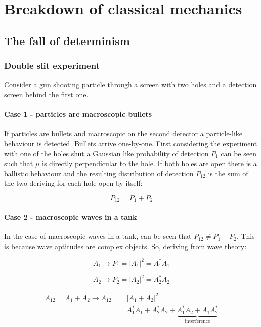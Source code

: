 \chapter{Breakdown of classical mechanics}

\section{The fall of determinism}

  \subsection{Double slit experiment}
  Consider a gun shooting particle through a screen with two holes and a detection screen behind the first one.

    \subsubsection{Case 1 - particles are macroscopic bullets}
    If particles are bullets and macroscopic on the second detector a particle-like behaviour is detected.
    Bullets arrive one-by-one.
    First considering the experiment with one of the holes shut a Gaussian like probability of detection $P_1$ can be seen such that $\mu$ is directly perpendicular to the hole.
    If both holes are open there is a ballistic behaviour and the resulting distribution of detection $P_{12}$ is the sum of the two deriving for each hole open by itself:

    $$P_{12} = P_1+P_2$$

    \subsubsection{Case 2 - macroscopic waves in a tank}
    In the case of macroscopic waves in a tank, can be seen that $P_{12} \neq P_1+P_2$.
    This is because wave aptitudes are complex objects.
    So, deriving from wave theory:

    $$A_1\rightarrow P_1 = |A_1|^2 = A_1^*A_1$$
      
    $$A_2\rightarrow P_2 = |A_2|^2 = A_2^*A_2$$

    \begin{align*}
      A_{12} = A_1+A_2\rightarrow A_{12} &= |A_1+A_2|^2=\\
                                         &=A_1^*A_1 + A_2^*A_2 + \underbrace{A_1^*A_2 + A_1A_2^*}_{\text{interference}}
    \end{align*}

